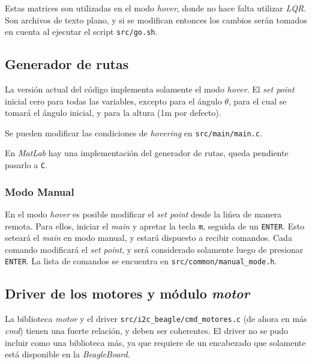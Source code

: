\documentclass[main]{subfiles}
\begin{document}
Estas matrices son utilizadas en el modo \textit{hover}, donde no hace falta utilizar \textit{LQR}. Son archivos de texto plano, y si se modifican entonces los cambios ser\'an tomados en cuenta al ejecutar el script \verb+src/go.sh+.

\subsection{Generador de rutas}
\label{sec:software:generador-de-rutas}

La versi\'on actual del c\'odigo implementa solamente el modo \textit{hover}. El \textit{set point} inicial cero para todas las variables, excepto para el \'angulo $\theta$, para el cual se tomar\'a el \'angulo inicial, y para la altura (1m por defecto).

Se pueden modificar las condiciones de \textit{hovering} en \verb+src/main/main.c+.

En \textit{MatLab} hay una implementaci\'on del generador de rutas, queda pendiente pasarlo a \verb+C+.

\subsubsection{Modo Manual}
\label{sec:software:modo-manual}

En el modo \textit{hover} es posible modificar el \textit{set point} desde la li\'nea de manera remota. Para ellos, iniciar el \textit{main} y apretar la tecla \verb+m+, seguida de un \verb+ENTER+. Esto setear\'a el \textit{main} en modo manual, y estar\'a dispuesto a recibir comandos. Cada comando modificar\'a el \textit{set point}, y ser\'a considerado solamente luego de presionar \verb+ENTER+. La lista de comandos se encuentra en \verb+src/common/manual_mode.h+.

\subsection{Driver de los motores y m\'odulo \textit{motor}}
\label{sec:software:cmd-motor}

La biblioteca \textit{motor} y el driver \verb+src/i2c_beagle/cmd_motores.c+ (de ahora en m\'as \textit{cmd}) tienen una fuerte relaci\'on, y deben ser coherentes. El driver no se pudo incluir como una biblioteca m\'as, ya que requiere de un encabezado que solamente est\'a disponible en la \textit{BeagleBoard}.
\end{document}
